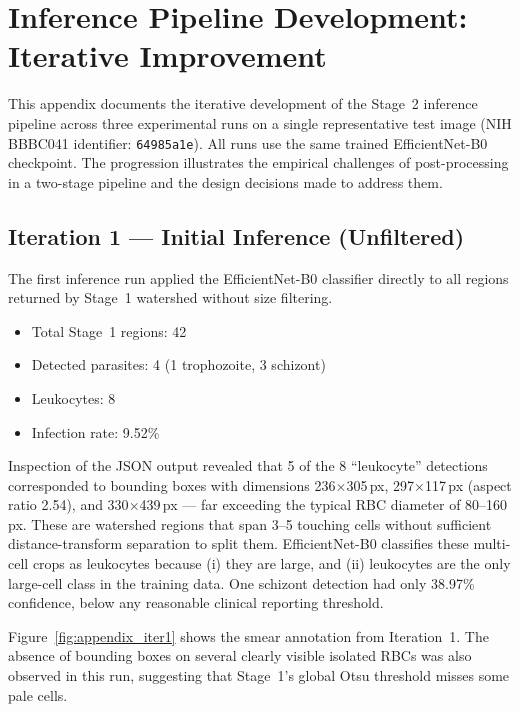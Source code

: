\documentclass[10pt,twocolumn]{article}
\begin{document}
\clearpage
\onecolumn
\captionsetup{hypcap=false}
\appendix

\section{Inference Pipeline Development: Iterative Improvement}
\label{app:iterations}

This appendix documents the iterative development of the Stage~2 inference
pipeline across three experimental runs on a single representative test
image (NIH BBBC041 identifier: \texttt{64985a1e}). All runs use the same
trained EfficientNet-B0 checkpoint. The progression illustrates the
empirical challenges of post-processing in a two-stage pipeline and the
design decisions made to address them.

\subsection*{Iteration 1 --- Initial Inference (Unfiltered)}

The first inference run applied the EfficientNet-B0 classifier directly to
all regions returned by Stage~1 watershed without size filtering.

\begin{itemize}
  \item Total Stage~1 regions: 42
  \item Detected parasites: 4 (1 trophozoite, 3 schizont)
  \item Leukocytes: 8
  \item Infection rate: 9.52\%
\end{itemize}

Inspection of the JSON output revealed that 5 of the 8 ``leukocyte''
detections corresponded to bounding boxes with dimensions 236$\times$305\,px,
297$\times$117\,px (aspect ratio 2.54), and 330$\times$439\,px --- far
exceeding the typical RBC diameter of 80--160\,px. These are watershed
regions that span 3--5 touching cells without sufficient distance-transform
separation to split them. EfficientNet-B0 classifies these multi-cell crops
as leukocytes because (i) they are large, and (ii) leukocytes are the only
large-cell class in the training data. One schizont detection had only 38.97\%
confidence, below any reasonable clinical reporting threshold.

Figure~\ref{fig:appendix_iter1} shows the smear annotation from Iteration~1.
The absence of bounding boxes on several clearly visible isolated RBCs was
also observed in this run, suggesting that Stage~1's global Otsu threshold
misses some pale cells.
\end{document}
